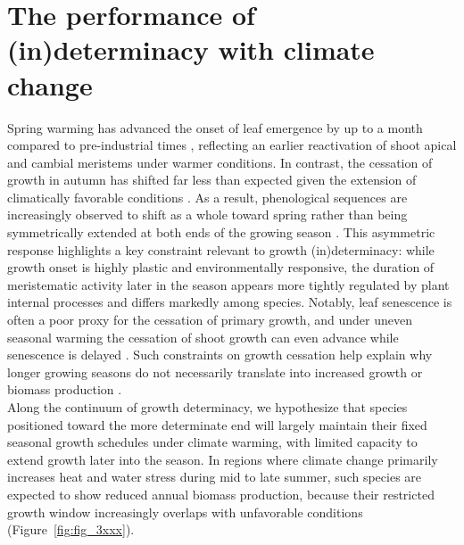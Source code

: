 \documentclass{article}
\begin{document}

	
\section*{The performance of (in)determinacy with climate change} 

Spring warming has advanced the onset of leaf emergence by up to a month compared to pre-industrial times \citep{vitasseGreatAccelerationPlant2022b}, reflecting an earlier reactivation of shoot apical and cambial meristems under warmer conditions. In contrast, the cessation of growth in autumn has shifted far less than expected given the extension of climatically favorable conditions \citep{zaniIncreasedGrowingseasonProductivity2020b, zohnerEffectClimateWarming2023}. As a result, phenological sequences are increasingly observed to shift as a whole toward spring rather than being symmetrically extended at both ends of the growing season \citep{keenanTimingAutumnSenescence2015b, mengConsistentTimeAllocation2024}. This asymmetric response highlights a key constraint relevant to growth (in)determinacy: while growth onset is highly plastic and environmentally responsive, the duration of meristematic activity later in the season appears more tightly regulated by plant internal processes and differs markedly among species. Notably, leaf senescence is often a poor proxy for the cessation of primary growth, and under uneven seasonal warming the cessation of shoot growth can even advance while senescence is delayed \citep{zohnerOngoingSeasonallyUneven2019b}. Such constraints on growth cessation help explain why longer growing seasons do not necessarily translate into increased growth or biomass production \citep{zaniIncreasedGrowingseasonProductivity2020b, boseDecreasingStemGrowth2025a, wolkovichWhyLongerSeasons2025, raoDecoupledCarbonAssimilation2026}.\\ 

Along the continuum of growth determinacy, we hypothesize that species positioned toward the more determinate end will largely maintain their fixed seasonal growth schedules under climate warming, with limited capacity to extend growth later into the season. In regions where climate change primarily increases heat and water stress during mid to late summer, such species are expected to show reduced annual biomass production, because their restricted growth window increasingly overlaps with unfavorable conditions (Figure~\ref{fig:fig_3xxx}).\\
\end{document}
